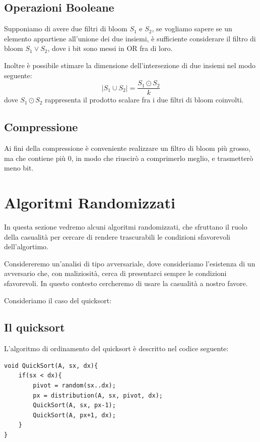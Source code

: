 \documentclass[a4paper,11pt]{book}
\begin{document}
\section{Operazioni Booleane}

Supponiamo di avere due filtri di bloom $S_1$ e $S_2$, se vogliamo sapere se un elemento appartiene all'unione dei due insiemi, \`e sufficiente considerare il filtro di bloom $S_1 \vee S_2$, dove i bit sono messi in \textsf{OR} fra di loro.

Inoltre \`e possibile stimare la dimensione dell'intersezione di due insiemi nel modo seguente: $$|S_1 \cup S_2| = \frac{S_1 \odot S_2}{k} $$ dove ${S_1 \odot S_2}$ rappresenta il prodotto scalare fra i due filtri di bloom coinvolti.

\section{Compressione}

Ai fini della compressione \`e conveniente realizzare un filtro di bloom pi\`u grosso, ma che contiene pi\`u 0, in modo che riuscir\`o a comprimerlo meglio, e trasmetter\`o meno bit.

\chapter{Algoritmi Randomizzati}

In questa sezione vedremo alcuni algoritmi randomizzati, che sfruttano il ruolo della casualit\`a per cercare di rendere trascurabili le condizioni sfavorevoli dell'algortimo.

Considereremo un'analisi di tipo avversariale, dove consideriamo l'esistenza di un avversario che, con maliziosit\`a, cerca di presentarci sempre le condizioni sfavorevoli. In questo contesto cercheremo di usare la casualit\`a a nostro favore.

Consideriamo il caso del quicksort:

\section{Il quicksort}

L'algoritmo di ordinamento del quicksort \`e descritto nel codice seguente:
\begin{lstlisting}
void QuickSort(A, sx, dx){
	if(sx < dx){
		pivot = random(sx..dx);
		px = distribution(A, sx, pivot, dx);
		QuickSort(A, sx, px-1);
		QuickSort(A, px+1, dx);
	}
}
\end{lstlisting}
\end{document}
